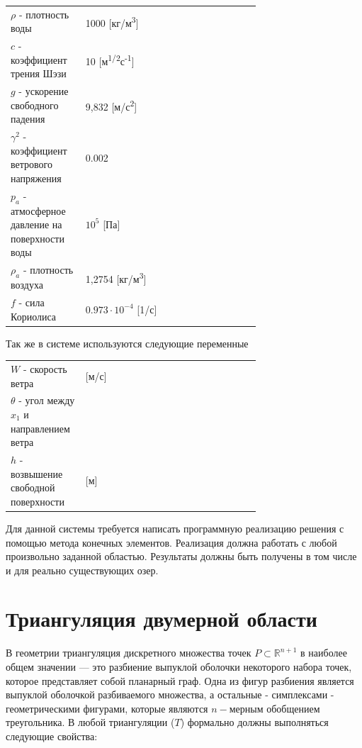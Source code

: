 \documentclass[14pt]{extreport}
\begin{document}
\begin{threeparttable}
\begin{longtable}[H]{lp{0.7\linewidth}}
{$\rho$} - плотность воды & 1000 [кг/м\textsuperscript3] \\
{$c$} - коэффициент трения Шэзи & 10 [м\textsuperscript{1/2}с\textsuperscript{-1}] \\
{$g$} - ускорение свободного падения & 9,832 [м/с\textsuperscript{2}] \\
{$\gamma^2$} - коэффициент ветрового напряжения & 0.002 \\

{$p_a$} - атмосферное давление на поверхности воды & $10^5$ [Па] \\
{$\rho_a$} - плотность воздуха & 1,2754 [кг/м\textsuperscript3] \\
{$f$} - сила Кориолиса & $0.973 \cdot 10^{-4}$ [1/с] \\
\end{longtable} 
\end{threeparttable}

Так же в системе используются следующие переменные

\begin{threeparttable}
\begin{longtable}[H]{lp{0.7\linewidth}}
{$W$} - скорость ветра & [м/с] \\
{$\theta$} - угол между $x_1$ и направлением ветра & \\
{$h$} - возвышение свободной поверхности & [м]
\end{longtable} 
\end{threeparttable}

Для данной системы требуется написать программную реализацию решения с помощью метода конечных элементов. Реализация должна работать с любой произвольно заданной областью. Результаты должны быть получены в том числе и для реально существующих озер.

\chapter{Триангуляция двумерной области}

В геометрии триангуляция дискретного множества точек $P\subset {\mathbb  {R}}^{{n+1}}$ в наиболее общем значении — это разбиение  выпуклой оболочки некоторого набора точек, которое представляет собой планарный граф. Одна из фигур разбиения является выпуклой оболочкой разбиваемого множества, а остальные - симплексами -  геометрическими фигурами, которые являются $n-$мерным обобщением треугольника. В любой триангуляции ($T$) формально должны выполняться следующие свойства:
\end{document}
